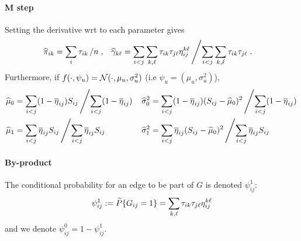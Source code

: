 \paragraph{M step}
Setting the derivative wrt to each parameter gives
\begin{align*}
 \widehat{\pi}_{ik} & = \sum_{i} \tau_{ik} \left/ n \right.,  
 & \widehat{\gamma}_{k\ell} & = \sum_{i < j} \sum_{k, \ell} \tau_{ik} \tau_{j\ell} \eta^{k\ell}_{ij} \left/ \sum_{i < j} \sum_{k, \ell} \tau_{ik} \tau_{j\ell} \right..
\end{align*}
Furthermore, if $f(\cdot, \psi_u) = \mathcal{N}(\cdot, \mu_u, \sigma_u^2)$ (i.e $\psi_u = (\mu_u, \sigma_u^2)$), 
\begin{align*}
 \widehat{\mu}_0 & = \sum_{i < j} (1 - \overline{\eta}_{ij}) S_{ij} \left/ \sum_{i < j} (1 - \overline{\eta}_{ij}) \right. 
 & \widehat{\sigma}_0^2 & = \sum_{i < j} (1 - \overline{\eta}_{ij}) (S_{ij} - \widehat{\mu}_0)^2 \left/ \sum_{i < j} (1 - \overline{\eta}_{ij}) \right. \\ 
 \widehat{\mu}_1 & = \sum_{i < j} \overline{\eta}_{ij} S_{ij} \left/ \sum_{i < j} \overline{\eta}_{ij} S_{ij} \right. 
 & \widehat{\sigma}_1^2 & = \sum_{i < j} \overline{\eta}_{ij} (S_{ij} - \widehat{\mu}_0)^2 \left/ \sum_{i < j} \overline{\eta}_{ij} S_{ij} \right. \\ 
\end{align*}

\paragraph{By-product}
The conditional probability for an edge to be part of $G$ is denoted $\psi_{ij}^1$:
$$
\psi_{ij}^1 := \widetilde{P}\{G_{ij} = 1\} = \sum_{k, \ell} \tau_{ik} \tau_{j\ell} \eta^{k\ell}_{ij} 
$$
and we denote $\psi_{ij}^0 = 1 - \psi_{ij}^1$.

